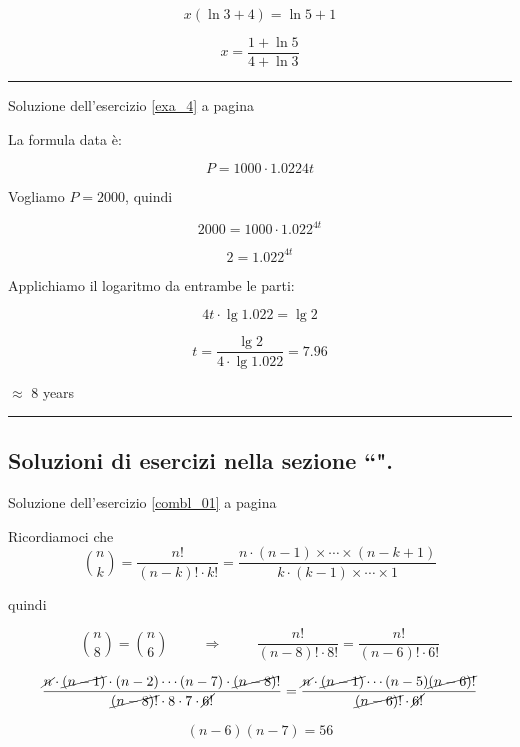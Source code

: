 \[
x(\ln3 +4)=\ln 5 +1
\]

\[
x=\frac{
1+\ln 5
}{
4+\ln 3
}
\]

\vspace{1cm}
\hrule
\vspace{1cm}

\begin{minipage}{\textwidth}
Soluzione dell'esercizio \ref{exa_4} a pagina \pageref{exa_4}\label{sola_4}

La formula data è: 

\[
P = 1000 \cdot 1.0224t
\]

Vogliamo $P=2000$, quindi 

\[
2000 = 1000 \cdot 1.022^{4t}
\]

\[
2= 1.022^{4t}
\]

Applichiamo il logaritmo da entrambe le parti:

\[
4t\cdot \lg 1.022 = \lg 2
\]


\[
t=\frac{
\lg 2
}{
4\cdot\lg 1.022
} = 7.96
\]

$\approx$ 8 years

\end{minipage}

\vspace{1cm}
\hrule
\vspace{1cm}


\subsection{Soluzioni di esercizi nella sezione ``\textbf{}".}

Soluzione dell'esercizio \ref{combl_01} a pagina \pageref{combl_01}\label{combs_01}

Ricordiamoci che 
\[
\binom{n}{k}=\frac{n!}{(n-k)!\cdot k!}
=\frac{
n\cdot(n-1)\times \cdots \times (n-k+1)
}{
k\cdot(k-1)\times \cdots \times 1
}
\]

quindi

\[
\binom{n}{8}=\binom{n}{6}
\hspace{1cm}\Rightarrow \hspace{1cm}
\frac{n!}{(n-8)! \cdot 8!} = \frac{n!}{(n-6)! \cdot 6!}
\]


\[
\frac{
\cancel{n} \cdot \cancel{(n-1)}\cdot(n-2) \cdots (n-7)\cdot \cancel{(n-8)}!
}
{
\cancel{(n-8)!} \cdot 8 \cdot 7 \cdot \cancel{6!}
} = \frac{
\cancel{n}\cdot\cancel{(n-1)}\cdots(n-5)\cancel{(n-6)!}
}{
\cancel{(n-6)!}\cdot\cancel{6!}
}
\]

\[
(n-6)(n-7) = 56
\]

